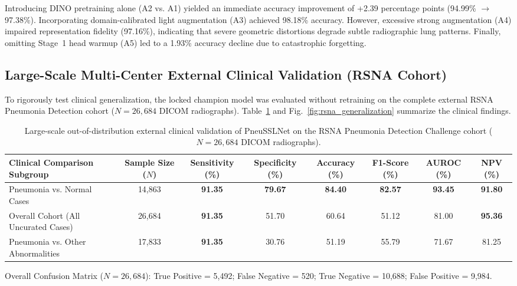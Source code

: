 \documentclass[journal,article,submit,moreauthors,pdftex]{Definitions/tsp}
\begin{document}
Introducing DINO pretraining alone (A2 vs. A1) yielded an immediate accuracy improvement of +2.39 percentage points (94.99\% $\to$ 97.38\%). Incorporating domain-calibrated light augmentation (A3) achieved 98.18\% accuracy. However, excessive strong augmentation (A4) impaired representation fidelity (97.16\%), indicating that severe geometric distortions degrade subtle radiographic lung patterns. Finally, omitting Stage~1 head warmup (A5) led to a 1.93\% accuracy decline due to catastrophic forgetting.

\subsection{Large-Scale Multi-Center External Clinical Validation (RSNA Cohort)} \label{sect:s4dot6}
To rigorously test clinical generalization, the locked champion model was evaluated without retraining on the complete external RSNA Pneumonia Detection cohort ($N=26,684$ DICOM radiographs). Table~\ref{tab:rsna_validation} and Fig.~\ref{fig:rsna_generalization} summarize the clinical findings.

\begin{table}[t]
\tablesize{\scriptsize}
\centering
\caption{Large-scale out-of-distribution external clinical validation of PneuSSLNet on the RSNA Pneumonia Detection Challenge cohort ($N=26,684$ DICOM radiographs).}
\label{tab:rsna_validation}
\begin{threeparttable}
\begin{adjustbox}{max width=\textwidth}
\begin{tabular}{l c c c c c c c}
\toprule
\textbf{Clinical Comparison Subgroup} & \textbf{Sample Size ($N$)} & \textbf{Sensitivity (\%)} & \textbf{Specificity (\%)} & \textbf{Accuracy (\%)} & \textbf{F1-Score (\%)} & \textbf{AUROC (\%)} & \textbf{NPV (\%)} \\
\midrule
Pneumonia vs. Normal Cases & 14,863 & \textbf{91.35} & \textbf{79.67} & \textbf{84.40} & \textbf{82.57} & \textbf{93.45} & \textbf{91.80} \\
Overall Cohort (All Uncurated Cases) & 26,684 & \textbf{91.35} & 51.70 & 60.64 & 51.12 & 81.00 & \textbf{95.36} \\
Pneumonia vs. Other Abnormalities & 17,833 & \textbf{91.35} & 30.76 & 51.19 & 55.79 & 71.67 & 81.25 \\
\bottomrule
\end{tabular}
\end{adjustbox}
\begin{tablenotes}
\item Overall Confusion Matrix ($N=26,684$): True Positive = 5,492; False Negative = 520; True Negative = 10,688; False Positive = 9,984.
\end{tablenotes}
\end{threeparttable}
\end{table}
\end{document}
